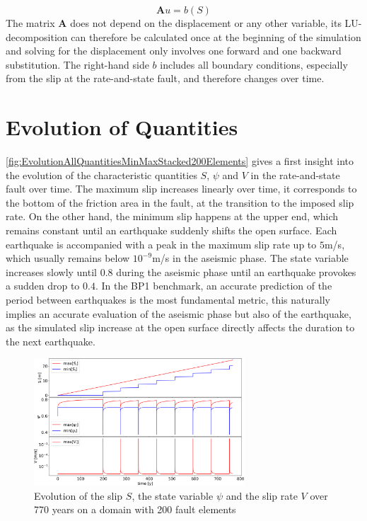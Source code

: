 \begin{equation}
	\mathbf{A}u = b(S)
\end{equation}
The matrix $\mathbf{A}$ does not depend on the displacement or any other variable, its LU-decomposition can therefore be calculated once at the beginning of the simulation and solving for the displacement only involves one forward and one backward substitution. The right-hand side $b$ includes all boundary conditions, especially from the slip at the rate-and-state fault, and therefore changes over time. 


\section{Evolution of Quantities}
\autoref{fig:EvolutionAllQuantitiesMinMaxStacked200Elements} gives a first insight into the evolution of the characteristic quantities $S$, $\psi$ and $V$ in the rate-and-state fault over time. The maximum slip increases linearly over time, it corresponds to the bottom of the friction area in the fault, at the transition to the imposed slip rate. On the other hand, the minimum slip happens at the upper end, which remains constant until an earthquake suddenly shifts the open surface. Each earthquake is accompanied with a peak in the maximum slip rate up to $5$m/s, which usually remains below $10^{-9}$m/s in the aseismic phase. The state variable increases slowly until $0.8$ during the aseismic phase until an earthquake provokes a sudden drop to $0.4$. In the BP1 benchmark, an accurate prediction of the period between earthquakes is the most fundamental metric, this naturally implies an accurate evaluation of the aseismic phase but also of the earthquake, as the simulated slip increase at the open surface directly affects the duration to the next earthquake.

\begin{figure}[H]
	\centering
	\includegraphics[width=0.7\textwidth]{images/TANDEMtimeEvolution_MinMaxAllStacked_Size200_RKDP5_extendedODE.png}
	\caption{Evolution of the slip $S$, the state variable $\psi$ and the slip rate $V$ over 770 years on a domain with 200 fault elements}
	\label{fig:EvolutionAllQuantitiesMinMaxStacked200Elements}
\end{figure}

